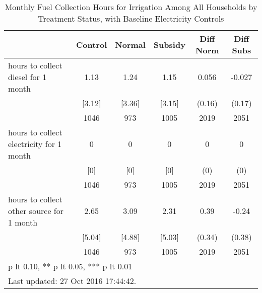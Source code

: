 \begin{table}[htbp]\centering
\def\sym#1{\ifmmode^{#1}\else\(^{#1}\)\fi}
\caption{Monthly Fuel Collection Hours for Irrigation Among All Households by Treatment Status, with Baseline Electricity Controls \label{tab:"balance"}}
\begin{tabular*}{0.9\hsize}{@{\hskip\tabcolsep\extracolsep\fill}l*{1}{ccccc}}
\toprule
                                &  Control&   Normal&  Subsidy&Diff Norm         &Diff Subs         \\
\midrule
hours to collect diesel for 1 month&     1.13&     1.24&     1.15&    0.056         &   -0.027         \\
                                &   [3.12]&   [3.36]&   [3.15]&   (0.16)         &   (0.17)         \\
                                &     1046&      973&     1005&     2019         &     2051         \\
hours to collect electricity for 1 month&        0&        0&        0&        0         &        0         \\
                                &      [0]&      [0]&      [0]&      (0)         &      (0)         \\
                                &     1046&      973&     1005&     2019         &     2051         \\
hours to collect other source for 1 month&     2.65&     3.09&     2.31&     0.39         &    -0.24         \\
                                &   [5.04]&   [4.88]&   [5.03]&   (0.34)         &   (0.38)         \\
                                &     1046&      973&     1005&     2019         &     2051         \\
\bottomrule
\multicolumn{6}{l}{\footnotesize * p lt 0.10, ** p lt 0.05, *** p lt 0.01}\\
\multicolumn{6}{l}{\footnotesize Last updated: 27 Oct 2016 17:44:42.}\\
\end{tabular*}
\end{table}
